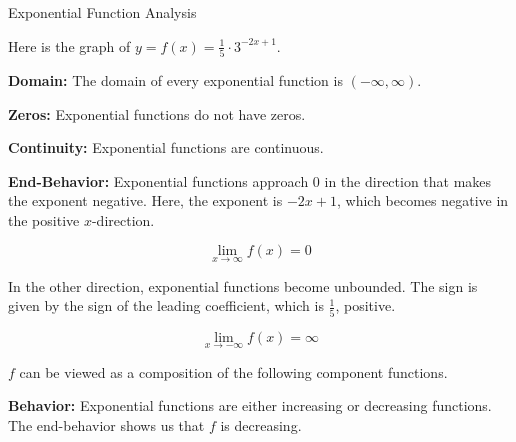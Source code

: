 \documentclass{ximera}
\begin{document}
\begin{example} Exponential Function Analysis



Here is the graph of $y = f(x) = \frac{1}{5} \cdot 3^{-2x+1}$.

\begin{image}
\end{image}



\textbf{Domain:}  The domain of every exponential function is $(-\infty, \infty )$.


\textbf{Zeros:} Exponential functions do not have zeros.


\textbf{Continuity:} Exponential functions are continuous.


\textbf{End-Behavior:} Exponential functions approach $0$ in the direction that makes the exponent negative. Here, the exponent is $-2x+1$, which becomes negative in the positive $x$-direction. 

\[ \lim\limits_{x \to \infty} f(x) = 0 \]


In the other direction, exponential functions become unbounded. The sign is given by the sign of the leading coefficient, which is $\frac{1}{5}$, positive.


\[ \lim\limits_{x \to -\infty} f(x) = \infty \]



$f$ can be viewed as a composition of the following component functions.


\textbf{Behavior:} Exponential functions are either increasing or decreasing functions.  The end-behavior shows us that $f$ is decreasing.



\end{example}
\end{document}
